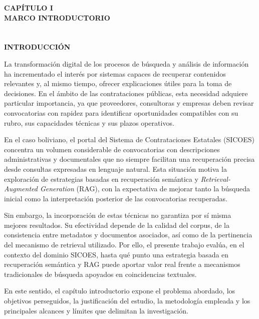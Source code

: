 \newpage
\thispagestyle{empty}
\vspace*{0.35\textheight}
\begin{center}
    {\Huge\textbf{CAPÍTULO I}} \\[0.5cm]
    {\Huge\textbf{MARCO INTRODUCTORIO}}
\end{center}

\newpage
{}
\section*{}
\begin{center}
	\Large \textbf{INTRODUCCIÓN}
\end{center}

La transformación digital de los procesos de búsqueda y análisis de información ha incrementado el interés por sistemas capaces de recuperar contenidos relevantes y, al mismo tiempo, ofrecer explicaciones útiles para la toma de decisiones. En el ámbito de las contrataciones públicas, esta necesidad adquiere particular importancia, ya que proveedores, consultoras y empresas deben revisar convocatorias con rapidez para identificar oportunidades compatibles con su rubro, sus capacidades técnicas y sus plazos operativos.

En el caso boliviano, el portal del Sistema de Contrataciones Estatales (SICOES) concentra un volumen considerable de convocatorias con descripciones administrativas y documentales que no siempre facilitan una recuperación precisa desde consultas expresadas en lenguaje natural. Esta situación motiva la exploración de estrategias basadas en recuperación semántica y \textit{Retrieval-Augmented Generation} (RAG), con la expectativa de mejorar tanto la búsqueda inicial como la interpretación posterior de las convocatorias recuperadas.

Sin embargo, la incorporación de estas técnicas no garantiza por sí misma mejores resultados. Su efectividad depende de la calidad del corpus, de la consistencia entre metadatos y documentos asociados, así como de la pertinencia del mecanismo de retrieval utilizado. Por ello, el presente trabajo evalúa, en el contexto del dominio SICOES, hasta qué punto una estrategia basada en recuperación semántica y RAG puede aportar valor real frente a mecanismos tradicionales de búsqueda apoyados en coincidencias textuales.

En este sentido, el capítulo introductorio expone el problema abordado, los objetivos perseguidos, la justificación del estudio, la metodología empleada y los principales alcances y límites que delimitan la investigación.

